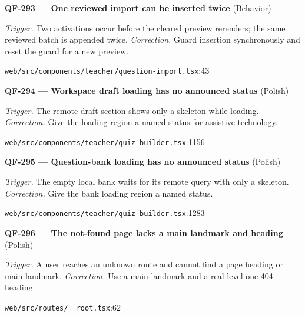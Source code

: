 \begin{minipage}{\linewidth}
\textbf{QF-293 --- One reviewed import can be inserted twice} {\scriptsize\color{accent}(Behavior)}\par
\textit{Trigger.} Two activations occur before the cleared preview rerenders; the same reviewed batch is appended twice. \textit{Correction.} Guard insertion synchronously and reset the guard for a new preview.\par
{\scriptsize\color{muted}\nolinkurl{web/src/components/teacher/question-import.tsx}:43}\par
\end{minipage}\par\vspace{7pt}
\begin{minipage}{\linewidth}
\textbf{QF-294 --- Workspace draft loading has no announced status} {\scriptsize\color{accent}(Polish)}\par
\textit{Trigger.} The remote draft section shows only a skeleton while loading. \textit{Correction.} Give the loading region a named status for assistive technology.\par
{\scriptsize\color{muted}\nolinkurl{web/src/components/teacher/quiz-builder.tsx}:1156}\par
\end{minipage}\par\vspace{7pt}
\begin{minipage}{\linewidth}
\textbf{QF-295 --- Question-bank loading has no announced status} {\scriptsize\color{accent}(Polish)}\par
\textit{Trigger.} The empty local bank waits for its remote query with only a skeleton. \textit{Correction.} Give the bank loading region a named status.\par
{\scriptsize\color{muted}\nolinkurl{web/src/components/teacher/quiz-builder.tsx}:1283}\par
\end{minipage}\par\vspace{7pt}
\begin{minipage}{\linewidth}
\textbf{QF-296 --- The not-found page lacks a main landmark and heading} {\scriptsize\color{accent}(Polish)}\par
\textit{Trigger.} A user reaches an unknown route and cannot find a page heading or main landmark. \textit{Correction.} Use a main landmark and a real level-one 404 heading.\par
{\scriptsize\color{muted}\nolinkurl{web/src/routes/__root.tsx}:62}\par
\end{minipage}\par\vspace{7pt}
